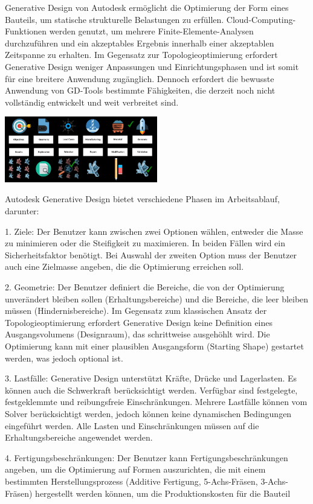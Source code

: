 Generative Design von Autodesk ermöglicht die Optimierung der Form eines Bauteils, um statische strukturelle Belastungen zu erfüllen. Cloud-Computing-Funktionen werden genutzt, um mehrere Finite-Elemente-Analysen durchzuführen und ein akzeptables Ergebnis innerhalb einer akzeptablen Zeitspanne zu erhalten. Im Gegensatz zur Topologieoptimierung erfordert Generative Design weniger Anpassungen und Einrichtungsphasen und ist somit für eine breitere Anwendung zugänglich. Dennoch erfordert die bewusste Anwendung von GD-Tools bestimmte Fähigkeiten, die derzeit noch nicht vollständig entwickelt und weit verbreitet sind. 

\includegraphics*[width=0.5\textwidth]{./images/Autodesk-Generative-Design-Framework.jpeg}

Autodesk Generative Design bietet verschiedene Phasen im Arbeitsablauf, darunter:

1. Ziele: Der Benutzer kann zwischen zwei Optionen wählen, entweder die Masse zu minimieren oder die Steifigkeit zu maximieren. In beiden Fällen wird ein Sicherheitsfaktor benötigt. Bei Auswahl der zweiten Option muss der Benutzer auch eine Zielmasse angeben, die die Optimierung erreichen soll.

2. Geometrie: Der Benutzer definiert die Bereiche, die von der Optimierung unverändert bleiben sollen (Erhaltungsbereiche) und die Bereiche, die leer bleiben müssen (Hindernisbereiche). Im Gegensatz zum klassischen Ansatz der Topologieoptimierung erfordert Generative Design keine Definition eines Ausgangsvolumens (Designraum), das schrittweise ausgehöhlt wird. Die Optimierung kann mit einer plausiblen Ausgangsform (Starting Shape) gestartet werden, was jedoch optional ist.

3. Lastfälle: Generative Design unterstützt Kräfte, Drücke und Lagerlasten. Es können auch die Schwerkraft berücksichtigt werden. Verfügbar sind festgelegte, festgeklemmte und reibungsfreie Einschränkungen. Mehrere Lastfälle können vom Solver berücksichtigt werden, jedoch können keine dynamischen Bedingungen eingeführt werden. Alle Lasten und Einschränkungen müssen auf die Erhaltungsbereiche angewendet werden.

4. Fertigungsbeschränkungen: Der Benutzer kann Fertigungsbeschränkungen angeben, um die Optimierung auf Formen auszurichten, die mit einem bestimmten Herstellungsprozess (Additive Fertigung, 5-Achs-Fräsen, 3-Achs-Fräsen) hergestellt werden können, um die Produktionskosten für die Bauteil

